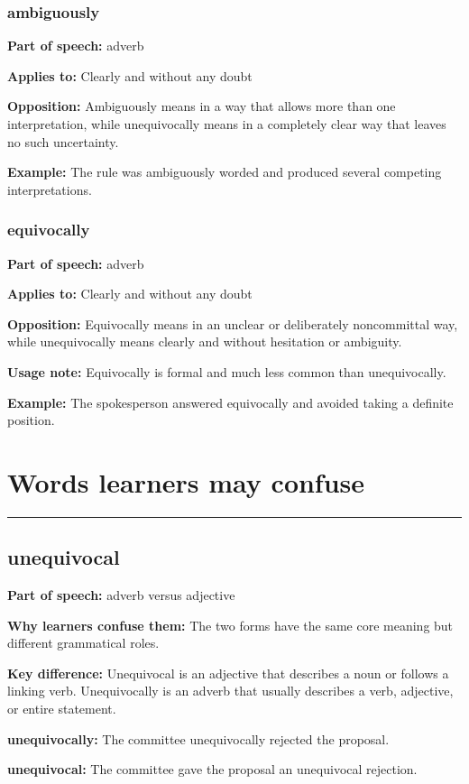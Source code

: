 \documentclass[11pt]{article}
\newcommand{\sectionrule}{\par\vspace{-0.5em}\noindent\textcolor{Accent}{\rule{\linewidth}{0.6pt}}\par}
\begin{document}
\subsubsection{ambiguously}
\textbf{Part of speech:} adverb

\textbf{Applies to:} Clearly and without any doubt

\textbf{Opposition:} Ambiguously means in a way that allows more than one interpretation, while unequivocally means in a completely clear way that leaves no such uncertainty.

\textbf{Example:} The rule was ambiguously worded and produced several competing interpretations.

\subsubsection{equivocally}
\textbf{Part of speech:} adverb

\textbf{Applies to:} Clearly and without any doubt

\textbf{Opposition:} Equivocally means in an unclear or deliberately noncommittal way, while unequivocally means clearly and without hesitation or ambiguity.

\textbf{Usage note:} Equivocally is formal and much less common than unequivocally.

\textbf{Example:} The spokesperson answered equivocally and avoided taking a definite position.

\section{Words learners may confuse}
\sectionrule
\subsection{unequivocal}
\textbf{Part of speech:} adverb versus adjective

\textbf{Why learners confuse them:} The two forms have the same core meaning but different grammatical roles.

\textbf{Key difference:} Unequivocal is an adjective that describes a noun or follows a linking verb. Unequivocally is an adverb that usually describes a verb, adjective, or entire statement.

\textbf{unequivocally:} The committee unequivocally rejected the proposal.

\textbf{unequivocal:} The committee gave the proposal an unequivocal rejection.
\end{document}
